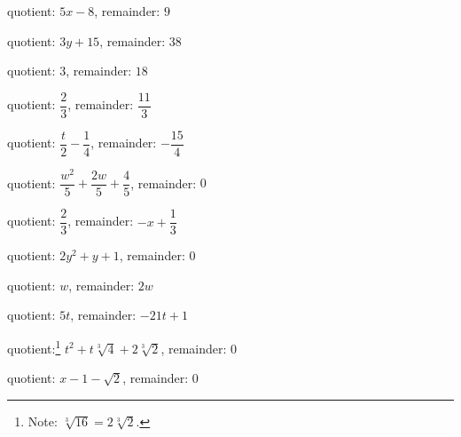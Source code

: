 \begin{tasks}[resume]

\task quotient: $5x-8$, remainder: $9$ 

\task quotient: $3y+15$, remainder: $38$

\task quotient: $3$, remainder: $18$ 

\task quotient: $\dfrac{2}{3}$, remainder: $\dfrac{11}{3}$

\task quotient: $\dfrac{t}{2} - \dfrac{1}{4}$, remainder: $-\dfrac{15}{4}$ 

\task quotient: $\dfrac{w^2}{5} + \dfrac{2w}{5} + \dfrac{4}{5}$, remainder: $0$

\task quotient: $\dfrac{2}{3}$, remainder: $-x + \dfrac{1}{3}$

\task quotient:  $2y^2+y+1$, remainder: $0$ 

\task quotient: $w$, remainder: $2w$

\task quotient: $5t$, remainder: $-21t + 1$

\task quotient:\footnote{Note: $\sqrt[3]{16} = 2\sqrt[3]{2}$.} $t^2 + t \sqrt[3]{4} + 2\sqrt[3]{2}$, remainder: $0$

\task quotient: $x -1 - \sqrt{2}$, remainder: 0  

\end{tasks}
